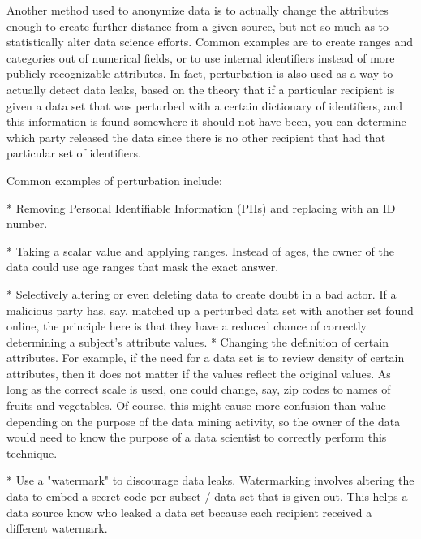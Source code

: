 \documentclass[10pt,journal,compsoc]{IEEEtran}
\begin{document}
	Another method used to anonymize data is to actually change the attributes enough to create further distance from a given source, but not so much as to statistically alter data science efforts.  Common examples are to create ranges and categories out of numerical fields, or to use internal identifiers instead of more publicly recognizable attributes.  In fact, perturbation is also used as a way to actually detect data leaks,  based on the theory that if a particular recipient is given a data set that was perturbed with a certain dictionary of identifiers, and this information is found somewhere it should not have been, you can determine which party released the data since there is no other recipient that had that particular set of identifiers.
	
	Common examples of perturbation include:\linebreak
	
	* Removing Personal Identifiable Information (PIIs) and replacing with an ID number. \linebreak
	
	* Taking a scalar value and applying ranges.  Instead of ages, the owner of the data could use age ranges that mask the exact answer.\linebreak
	
	* Selectively altering or even deleting data to create doubt in a bad actor.  If a malicious party has, say, matched up a perturbed data set with another set found online, the principle here is that they have a reduced chance of correctly determining a subject's attribute values.  
	* Changing the definition of certain attributes.  For example, if the need for a data set is to review density of certain attributes, then it does not matter if the values reflect the original values.  As long as the correct scale is used, one could change, say, zip codes to names of fruits and vegetables.  Of course, this might cause more confusion than value depending on the purpose of the data mining activity, so the owner of the data would need to know the purpose of a data scientist to correctly perform this technique.\linebreak
	
	* Use a "watermark" to discourage data leaks.  Watermarking involves altering the data to embed a secret code per subset / data set that is given out.  This helps a data source know who leaked a data set because each recipient received a different watermark.\linebreak
	
\end{document}
